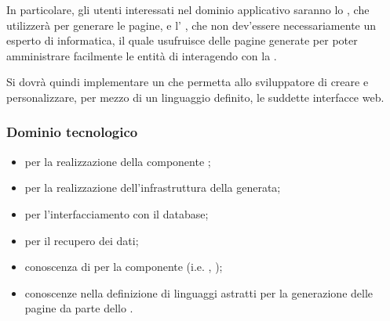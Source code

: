        
In particolare, gli utenti interessati nel dominio applicativo saranno lo  , che utilizzerà \ProjectName{} per generare le pagine, e l' , che non dev'essere necessariamente un esperto di informatica, il quale usufruisce delle pagine generate per poter amministrare facilmente le entità di   interagendo con la  .

Si dovrà quindi implementare un  che permetta allo sviluppatore di creare e personalizzare, per mezzo di un linguaggio   definito, le suddette interfacce web.
        
        \subsubsection{Dominio tecnologico}
        \begin{itemize}
                \item \textbf{ } per la realizzazione della componente  ;
                \item \textbf{ } per la realizzazione dell'infrastruttura della   generata;
                \item \textbf{ } per l'interfacciamento con il database;
                \item \textbf{ } per il recupero dei dati;
                \item conoscenza di   per la componente   (i.e.  ,  );
                \item conoscenze nella definizione di linguaggi astratti   per la generazione delle pagine da parte dello  .
        \end{itemize}


